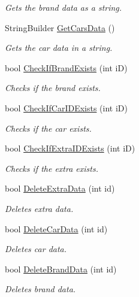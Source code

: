 \begin{DoxyCompactItemize}
\begin{DoxyCompactList}\small\item\em Gets the brand data as a string. \end{DoxyCompactList}\item 
String\+Builder \mbox{\hyperlink{interface_car_shop_1_1_logic_1_1_i_logic_a8e19c6c27464776cae749bb71888716d}{Get\+Cars\+Data}} ()
\begin{DoxyCompactList}\small\item\em Gets the car data in a string. \end{DoxyCompactList}\item 
bool \mbox{\hyperlink{interface_car_shop_1_1_logic_1_1_i_logic_a5871000bbf6724abebf701f30113e488}{Check\+If\+Brand\+Exists}} (int iD)
\begin{DoxyCompactList}\small\item\em Checks if the brand exists. \end{DoxyCompactList}\item 
bool \mbox{\hyperlink{interface_car_shop_1_1_logic_1_1_i_logic_ab82e00aae902a6d7417b586487568d93}{Check\+If\+Car\+I\+D\+Exists}} (int iD)
\begin{DoxyCompactList}\small\item\em Checks if the car exists. \end{DoxyCompactList}\item 
bool \mbox{\hyperlink{interface_car_shop_1_1_logic_1_1_i_logic_a86f7d6d049a74365b7bc3e135f11a539}{Check\+If\+Extra\+I\+D\+Exists}} (int iD)
\begin{DoxyCompactList}\small\item\em Checks if the extra exists. \end{DoxyCompactList}\item 
bool \mbox{\hyperlink{interface_car_shop_1_1_logic_1_1_i_logic_a224a696141bf86a3f16c8ef9d5d4832b}{Delete\+Extra\+Data}} (int id)
\begin{DoxyCompactList}\small\item\em Deletes extra data. \end{DoxyCompactList}\item 
bool \mbox{\hyperlink{interface_car_shop_1_1_logic_1_1_i_logic_ad11a46d5ab973ec4f7c9a56a1fb98907}{Delete\+Car\+Data}} (int id)
\begin{DoxyCompactList}\small\item\em Deletes car data. \end{DoxyCompactList}\item 
bool \mbox{\hyperlink{interface_car_shop_1_1_logic_1_1_i_logic_aa8a7a73b34402f97bdf72e3162b95996}{Delete\+Brand\+Data}} (int id)
\begin{DoxyCompactList}\small\item\em Deletes brand data. \end{DoxyCompactList}\end{DoxyCompactItemize}


